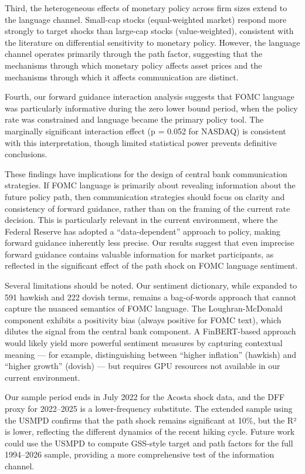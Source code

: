 \documentclass[12pt]{article}
\begin{document}
Third, the heterogeneous effects of monetary policy across firm sizes
extend to the language channel. Small-cap stocks (equal-weighted market)
respond more strongly to target shocks than large-cap stocks
(value-weighted), consistent with the literature on differential
sensitivity to monetary policy. However, the language channel operates
primarily through the path factor, suggesting that the mechanisms
through which monetary policy affects asset prices and the mechanisms
through which it affects communication are distinct.

Fourth, our forward guidance interaction analysis suggests that FOMC
language was particularly informative during the zero lower bound
period, when the policy rate was constrained and language became the
primary policy tool. The marginally significant interaction effect (p =
0.052 for NASDAQ) is consistent with this interpretation, though limited
statistical power prevents definitive conclusions.

These findings have implications for the design of central bank
communication strategies. If FOMC language is primarily about revealing
information about the future policy path, then communication strategies
should focus on clarity and consistency of forward guidance, rather than
on the framing of the current rate decision. This is particularly
relevant in the current environment, where the Federal Reserve has
adopted a ``data-dependent'' approach to policy, making forward guidance
inherently less precise. Our results suggest that even imprecise forward
guidance contains valuable information for market participants, as
reflected in the significant effect of the path shock on FOMC language
sentiment.

Several limitations should be noted. Our sentiment dictionary, while
expanded to 591 hawkish and 222 dovish terms, remains a bag-of-words
approach that cannot capture the nuanced semantics of FOMC language. The
Loughran-McDonald component exhibits a positivity bias (always positive
for FOMC text), which dilutes the signal from the central bank
component. A FinBERT-based approach would likely yield more powerful
sentiment measures by capturing contextual meaning --- for example,
distinguishing between ``higher inflation'' (hawkish) and ``higher
growth'' (dovish) --- but requires GPU resources not available in our
current environment.

Our sample period ends in July 2022 for the Acosta shock data, and the
DFF proxy for 2022--2025 is a lower-frequency substitute. The extended
sample using the USMPD confirms that the path shock remains significant
at 10\%, but the R² is lower, reflecting the different dynamics of the
recent hiking cycle. Future work could use the USMPD to compute
GSS-style target and path factors for the full 1994--2026 sample,
providing a more comprehensive test of the information channel.
\end{document}
